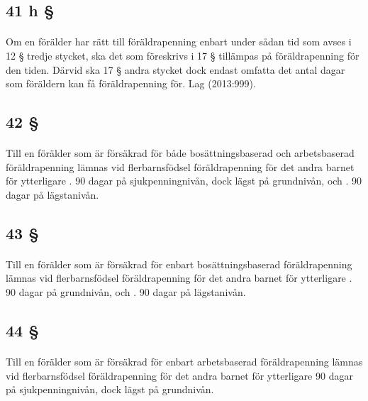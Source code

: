 \documentclass[a4paper,notitlepage,openany,10pt]{book}
\begin{document}
\subsection*{41 h §}
\paragraph*{}
Om en förälder har rätt till föräldrapenning enbart under sådan tid som avses i 12 § tredje stycket, ska det som föreskrivs i 17 § tillämpas på föräldrapenning för den tiden.
Därvid ska 17 § andra stycket dock endast omfatta det antal dagar som föräldern kan få föräldrapenning för.
Lag (2013:999).
\subsection*{42 §}
\paragraph*{}
Till en förälder som är försäkrad för både bosättningsbaserad och arbetsbaserad föräldrapenning lämnas vid flerbarnsfödsel föräldrapenning för det andra barnet för ytterligare
. 90 dagar på sjukpenningnivån, dock lägst på grundnivån, och
. 90 dagar på lägstanivån.
\subsection*{43 §}
\paragraph*{}
Till en förälder som är försäkrad för enbart bosättningsbaserad föräldrapenning lämnas vid flerbarnsfödsel föräldrapenning för det andra barnet för ytterligare
. 90 dagar på grundnivån, och
. 90 dagar på lägstanivån.
\subsection*{44 §}
\paragraph*{}
Till en förälder som är försäkrad för enbart arbetsbaserad föräldrapenning lämnas vid flerbarnsfödsel föräldrapenning för det andra barnet för ytterligare 90 dagar på sjukpenningnivån, dock lägst på grundnivån.
\end{document}
